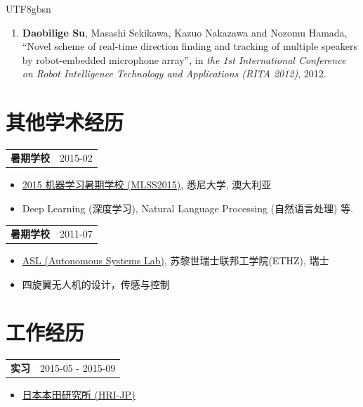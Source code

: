 \documentclass[margin,line]{res}
\begin{document}
\begin{CJK*}{UTF8}{gbsn}
\begin{resume}
\begin{enumerate}
\item {\bf Daobilige Su}, Masashi Sekikawa, Kazuo Nakazawa and Nozomu Hamada, ``Novel scheme of real-time direction finding and tracking of multiple speakers by robot-embedded microphone array'', in {\it the 1st International Conference on Robot Intelligence Technology and Applications (RITA 2012)}, 2012.

\end{enumerate}

\section{\sc 其他学术经历}

\begin{tabularx}{\textwidth}{X r}
{\bf 暑期学校} & 2015-02\\
\end{tabularx}
\begin{itemize}
\item[] \href{http://rp-www.cs.usyd.edu.au/~mlss/}{2015 机器学习暑期学校 (MLSS2015)}, 悉尼大学, 澳大利亚

\vspace*{-2.5mm}
\item[] Deep Learning (深度学习), Natural Language Processing (自然语言处理) 等.
\end{itemize}

\begin{tabularx}{\textwidth}{X r}
{\bf 暑期学校} & 2011-07\\
\end{tabularx}
\begin{itemize}
\item[] \href{http://www.asl.ethz.ch}{ASL (Autonomous Systems Lab)}, 苏黎世瑞士联邦工学院(ETHZ), 瑞士

\vspace*{-2.5mm}
\item[] 四旋翼无人机的设计，传感与控制
\end{itemize}

\section{\sc 工作经历}

\begin{tabularx}{\textwidth}{X r}
{\bf 实习} & 2015-05 - 2015-09\\
\end{tabularx}
\begin{itemize}
\item[] \href{http://www.jp.honda-ri.com/english}{日本本田研究所 (HRI-JP)}


\end{itemize}
\end{resume}
\end{CJK*}
\end{document}
